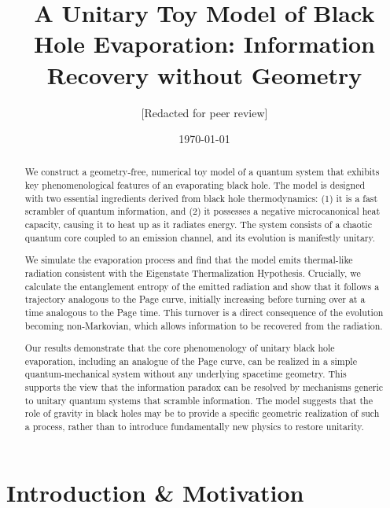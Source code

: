 \documentclass[aps,prx,onecolumn,showpacs,superscriptaddress,longbibliography,nofootinbib]{revtex4-2}
\begin{document}

\title{A Unitary Toy Model of Black Hole Evaporation: Information Recovery without Geometry}

\author{[Redacted for peer review]}
\date{\today}

\begin{abstract}
We construct a geometry-free, numerical toy model of a quantum system that exhibits key phenomenological features of an evaporating black hole. The model is designed with two essential ingredients derived from black hole thermodynamics: (1) it is a fast scrambler of quantum information, and (2) it possesses a negative microcanonical heat capacity, causing it to heat up as it radiates energy. The system consists of a chaotic quantum core coupled to an emission channel, and its evolution is manifestly unitary.

We simulate the evaporation process and find that the model emits thermal-like radiation consistent with the Eigenstate Thermalization Hypothesis. Crucially, we calculate the entanglement entropy of the emitted radiation and show that it follows a trajectory analogous to the Page curve, initially increasing before turning over at a time analogous to the Page time. This turnover is a direct consequence of the evolution becoming non-Markovian, which allows information to be recovered from the radiation.

Our results demonstrate that the core phenomenology of unitary black hole evaporation, including an analogue of the Page curve, can be realized in a simple quantum-mechanical system without any underlying spacetime geometry. This supports the view that the information paradox can be resolved by mechanisms generic to unitary quantum systems that scramble information. The model suggests that the role of gravity in black holes may be to provide a specific geometric realization of such a process, rather than to introduce fundamentally new physics to restore unitarity.
\end{abstract}

\maketitle

\section{Introduction \& Motivation}
\end{document}
